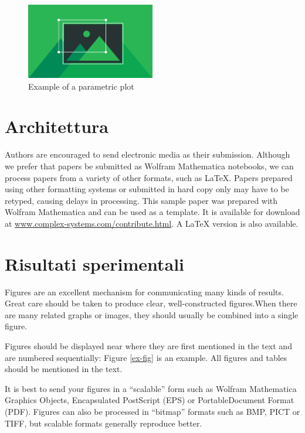 \documentclass{article}
\begin{document}
\begin{figure}[h]
\centering
\includegraphics[width=0.5\textwidth]{introduzioneimg1.png}
\caption{Example of a parametric plot}
\end{figure}
\break

\section{Architettura}

Authors are encouraged to send electronic media as their submission. Although we prefer that papers be submitted as Wolfram Mathematica notebooks, we can process papers from a variety of other formats, such as LaTeX. Papers prepared using other formatting systems or submitted in hard copy only may have to be retyped, causing delays in processing. This sample paper was prepared with Wolfram Mathematica and can be used as a template. It is available for download at \url{www.complex-systems.com/contribute.html}. A LaTeX version is also available.

\section{Risultati sperimentali}

Figures are an excellent mechanism for communicating many kinds of results. Great care should be taken to produce clear, well-constructed figures.When there are many related graphs or images, they should usually be combined into a single figure. 

Figures should be displayed near where they are first mentioned in the text and are numbered sequentially: Figure \ref{ex-fig} is an example. All figures and tables should be mentioned in the text.

It is best to send your figures in a {``}scalable{''} form such as Wolfram Mathematica Graphics Objects, Encapsulated PostScript (EPS) or PortableDocument Format (PDF). Figures can also be processed in {``}bitmap{''} formats such as BMP, PICT or TIFF, but scalable formats generally reproduce better.
\end{document}
